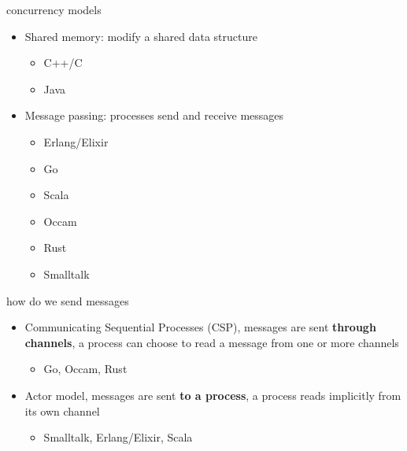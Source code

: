 \begin{frame}{concurrency models}

  \begin{itemize}
  \pause
  \item Shared memory:  modify a shared data structure
    \begin{itemize}
    \item C++/C
    \item Java
    \end{itemize} \pause
  \pause
  \item Message passing: processes send and receive messages
    \begin{itemize}
    \item Erlang/Elixir 
    \item Go 
    \item Scala 
    \item Occam
    \item Rust
    \item Smalltalk
    \end{itemize}
  \end{itemize}

  \pause
  \vspace{40pt}{\em There are more, but these are the two large groups.}
\end{frame}

\begin{frame}{how do we send messages}

  \begin{itemize}
  \item Communicating Sequential Processes (CSP), messages are sent
    {\bf through channels}, a process can choose to read a message from one
    or more channels \pause
    \begin{itemize}
    \item Go, Occam, Rust
    \end{itemize}
    \pause
    
  \item Actor model, messages are sent {\bf to a process}, a process reads
    implicitly from its own channel \pause
    \begin{itemize}
    \item Smalltalk, Erlang/Elixir,  Scala 
    \end{itemize}    
  \end{itemize}
\end{frame}



